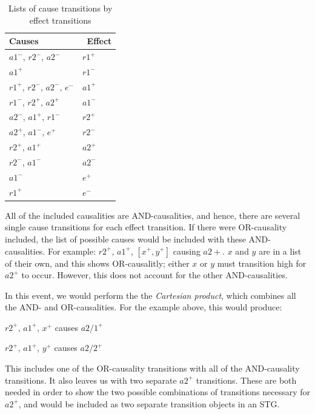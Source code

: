 \documentclass[british,conference,compsoc]{IEEEtran}
\begin{document}
\begin{table}[h]
\caption{Lists of cause transitions by effect transitions
		\label{tab:list-of-concepts}}
  \centering
\begin{tabular}[htb]{| m{2.7cm} | m{2.0cm} |}
  \hline
Causes & \, Effect \\ \hline \hline
$a1^{-}$, $r2^{-}$, $a2^{-}$ 			& $r1^{+}$ 	\\ \hline
$a1^{+}$ 						& $r1^{-}$ 	\\ \hline
$r1^{+}$, $r2^{-}$, $a2^{-}$, $e^{-}$ 	& $a1^{+}$ 	\\ \hline
$r1^{-}$, $r2^{+}$, $a2^{+}$ 			& $a1^{-}$ 	\\ \hline
$a2^{-}$, $a1^{+}$, $r1^{-}$ 			& $r2^{+}$ 	\\ \hline
$a2^{+}$, $a1^{-}$, $e^{+}$ 			& $r2^{-}$ 	\\ \hline
$r2^{+}$, $a1^{+}$ 				& $a2^{+}$ 	\\ \hline
$r2^{-}$, $a1^{-}$ 				& $a2^{-}$ 	\\ \hline
$a1^{-}$ 						& $e^{+}$ 	\\ \hline
$r1^{+}$ 						& $e^{-}$	\\ \hline

  \end{tabular}
  \vspace{-3mm}
\end{table}

\noindent All of the included causalities are AND-causalities, and hence, there
are several single cause transitions for each effect transition. If there were 
OR-causality included, the list of possible causes would be included with these
AND-causalities. For example:  $r2^{+}$, $a1^{+}$, $[x^{+}, y^{+}]$ causing
$a2{+}$. $x$ and $y$ are in a list of their own, and this shows OR-causalitly;
either $x$ or $y$ must transition high for $a2^{+}$ to occur. However, this does
not account for the other AND-causalities. 

In this event, we would perform the the \emph{Cartesian product}, which combines
all the AND- and OR-causalities. For the example above, this would produce:

$r2^{+}$, $a1^{+}$, $x^{+}$ causes $a2/1^{+}$

$r2^{+}$, $a1^{+}$, $y^{+}$ causes $a2/2^{+}$

\noindent This includes one of the OR-causality transitions with all of the 
AND-causality transitions. It also leaves us with two separate $a2^{+}$ 
transitions. These are both needed in order to show the two possible 
combinations of transitions necessary for $a2^{+}$, and would be included as two
separate transition objects in an STG. 
\end{document}
